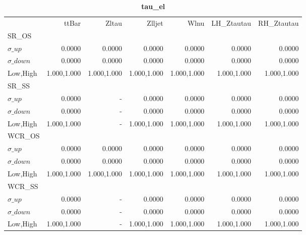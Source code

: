 \documentclass[11pt,oneside,a4paper]{article}
\begin{document}
\begin{table}
\caption{\bf{tau\_el}}
\centering
\begin{tabular}{lrrrrrr}
& ttBar & Zltau & Zlljet & Wlnu & LH\_Ztautau & RH\_Ztautau \\

SR\_OS &  &  &  &  &  &  \\
$\sigma\_up$ & 0.0000 & 0.0000 & 0.0000 & 0.0000 & 0.0000 & 0.0000 \\
$\sigma\_down$ & 0.0000 & 0.0000 & 0.0000 & 0.0000 & 0.0000 & 0.0000 \\
Low,High & 1.000,1.000 & 1.000,1.000 & 1.000,1.000 & 1.000,1.000 & 1.000,1.000 & 1.000,1.000 \\

\hline
SR\_SS &  &  &  &  &  &  \\
$\sigma\_up$ & 0.0000 & - & 0.0000 & 0.0000 & 0.0000 & 0.0000 \\
$\sigma\_down$ & 0.0000 & - & 0.0000 & 0.0000 & 0.0000 & 0.0000 \\
Low,High & 1.000,1.000 & - & 1.000,1.000 & 1.000,1.000 & 1.000,1.000 & 1.000,1.000 \\

\hline
WCR\_OS &  &  &  &  &  &  \\
$\sigma\_up$ & 0.0000 & 0.0000 & 0.0000 & 0.0000 & 0.0000 & 0.0000 \\
$\sigma\_down$ & 0.0000 & 0.0000 & 0.0000 & 0.0000 & 0.0000 & 0.0000 \\
Low,High & 1.000,1.000 & 1.000,1.000 & 1.000,1.000 & 1.000,1.000 & 1.000,1.000 & 1.000,1.000 \\

\hline
WCR\_SS &  &  &  &  &  &  \\
$\sigma\_up$ & 0.0000 & - & 0.0000 & 0.0000 & 0.0000 & 0.0000 \\
$\sigma\_down$ & 0.0000 & - & 0.0000 & 0.0000 & 0.0000 & 0.0000 \\
Low,High & 1.000,1.000 & - & 1.000,1.000 & 1.000,1.000 & 1.000,1.000 & 1.000,1.000 \\
\end{tabular}
\end{table}
\end{document}
